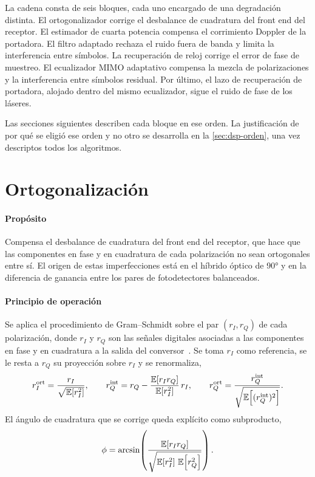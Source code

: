 La cadena consta de seis bloques, cada uno encargado de una degradaci\'on
distinta. El ortogonalizador corrige el desbalance de cuadratura del front end
del receptor. El estimador de cuarta potencia compensa el corrimiento Doppler
de la portadora. El filtro adaptado rechaza el ruido fuera de banda y limita
la interferencia entre s\'imbolos. La recuperaci\'on de reloj corrige el error
de fase de muestreo. El ecualizador MIMO adaptativo compensa la mezcla de
polarizaciones y la interferencia entre s\'imbolos residual. Por \'ultimo, el
lazo de recuperaci\'on de portadora, alojado dentro del mismo ecualizador,
sigue el ruido de fase de los l\'aseres.

Las secciones siguientes describen cada bloque en ese orden. La
justificaci\'on de por qu\'e se eligi\'o ese orden y no otro se desarrolla en
la \cref{sec:dsp-orden}, una vez descriptos todos los algoritmos.

\section{Ortogonalizaci\'on}
\label{sec:dsp-gsop}

\paragraph{Prop\'osito}
Compensa el desbalance de cuadratura del front end del receptor, que hace que
las componentes en fase y en cuadratura de cada polarizaci\'on no sean
ortogonales entre s\'i. El origen de estas imperfecciones est\'a en el
h\'ibrido \'optico de \ang{90} y en la diferencia de ganancia entre los pares
de fotodetectores balanceados.

\paragraph{Principio de operaci\'on}
Se aplica el procedimiento de Gram--Schmidt sobre el par $(r_I, r_Q)$ de cada
polarizaci\'on, donde $r_I$ y $r_Q$ son las se\~nales digitales asociadas a
las componentes en fase y en cuadratura a la salida del
conversor~\cite[ec.~(4.22)--(4.24)]{mello2021}. Se toma $r_I$ como
referencia, se le resta a $r_Q$ su proyecci\'on sobre $r_I$ y se renormaliza,
\begin{equation}
  r_I^{\mathrm{ort}} = \frac{r_I}{\sqrt{\mathbb{E}\!\left[r_I^2\right]}},
  \qquad
  r_Q^{\mathrm{int}} = r_Q - \frac{\mathbb{E}\!\left[r_I r_Q\right]}{\mathbb{E}\!\left[r_I^2\right]}\, r_I,
  \qquad
  r_Q^{\mathrm{ort}} = \frac{r_Q^{\mathrm{int}}}{\sqrt{\mathbb{E}\!\left[(r_Q^{\mathrm{int}})^2\right]}}.
  \label{eq:gsop}
\end{equation}
El \'angulo de cuadratura que se corrige queda expl\'icito como subproducto,
\begin{equation}
  \phi = \arcsin\!\left(\frac{\mathbb{E}\!\left[r_I r_Q\right]}{\sqrt{\mathbb{E}\!\left[r_I^2\right]\,\mathbb{E}\!\left[r_Q^2\right]}}\right).
  \label{eq:gsop-phi}
\end{equation}

